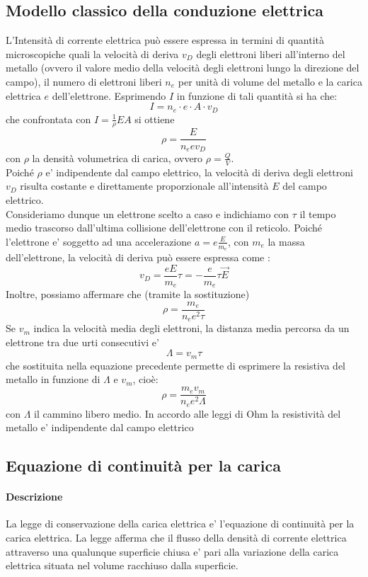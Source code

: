 \documentclass[a4paper, 10pt]{article}
\begin{document}
		\subsection{Modello classico della conduzione elettrica}
			L'Intensità di corrente elettrica può essere espressa in termini di quantità microscopiche quali la velocità
			di deriva $v_D$ degli elettroni liberi all'interno del metallo (ovvero il valore medio della velocità degli
			elettroni lungo la direzione del campo), il numero di elettroni liberi $n_e$ per unità di volume del metallo e 
			la carica elettrica $e$ dell'elettrone. Esprimendo $I$ in funzione di tali quantità si ha che:
			\[ I = n_e \cdot e \cdot A \cdot v_D \] che confrontata con $I = \frac{1}{\rho} EA $ si ottiene
			\[ \rho = \frac{E}{n_e e v_D} \] con $\rho$ la densità volumetrica di carica, ovvero $\rho = \frac{Q}{V}$.\\
			Poiché $\rho$ e' indipendente dal campo elettrico, la velocità di deriva degli elettroni $v_D$ risulta costante e
			direttamente proporzionale all'intensità $E$ del campo elettrico. \\
			Consideriamo dunque un elettrone scelto a caso e indichiamo con $\tau$ il tempo medio trascorso dall'ultima 
			collisione dell'elettrone con il reticolo. Poiché l'elettrone e' soggetto ad una accelerazione 
			$a = e \frac{E}{m_e}$, con $m_e$ la massa dell'elettrone, la velocità di deriva può essere espressa come : 
			\[ v_D = \frac{e E}{m_e} \tau  = - \frac{e}{m_e}\tau \overrightarrow{E} \]
			Inoltre, possiamo affermare che (tramite la sostituzione) 
			\[ \rho = \frac{m_e}{n_e e^2 \tau} \]
			Se $v_m$ indica la velocità media degli elettroni, la distanza media percorsa da un elettrone tra due 
			urti consecutivi e' \[ \Lambda = v_m \tau \]
			che sostituita nella equazione precedente permette di esprimere la resistiva del metallo in funzione 
			di $\Lambda$ e $v_m$, cioè:
			\[ \rho = \frac{m_e v_m}{n_e e^2 \Lambda} \]
			con $\Lambda$ il cammino libero medio. In accordo alle leggi di Ohm la resistività del metallo e'
			indipendente dal campo elettrico 
		\subsection{Equazione di continuità per la carica}
			\paragraph*{Descrizione}
			La legge di conservazione della carica elettrica e' l'equazione di continuità per la carica elettrica. 
			La legge afferma che il flusso della densità di corrente elettrica attraverso una qualunque superficie 
			chiusa e' pari alla variazione della carica elettrica situata nel volume racchiuso dalla superficie.
\end{document}
